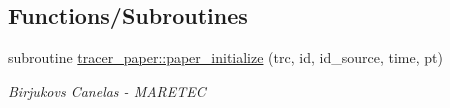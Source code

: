 \subsection*{Functions/\+Subroutines}
\begin{DoxyCompactItemize}
\item 
subroutine \mbox{\hyperlink{namespacetracer__paper_aad494497e50de353bb7458cc82fd617d}{tracer\+\_\+paper\+::paper\+\_\+initialize}} (trc, id, id\+\_\+source, time, pt)
\begin{DoxyCompactList}\small\item\em Birjukovs Canelas -\/ M\+A\+R\+E\+T\+EC \end{DoxyCompactList}\end{DoxyCompactItemize}
